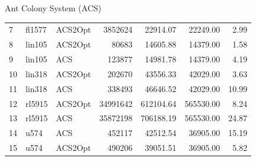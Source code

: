 \documentclass{beamer}
\begin{document}
\begin{frame}{Ant Colony System (ACS)}
\begin{table}[H]
\begin{tabular}{lllrrrr}
            7  & fl1577   & ACS2Opt   & 3852624    & 22914.07       & 22249.00         & 2.99  \\
            8  & lin105   & ACS2Opt   & 80683      & 14605.88       & 14379.00         & 1.58  \\
            9  & lin105   & ACS       & 123877     & 14981.78       & 14379.00         & 4.19  \\
            10 & lin318   & ACS2Opt   & 202670     & 43556.33       & 42029.00         & 3.63  \\
            11 & lin318   & ACS       & 338493     & 46646.52       & 42029.00         & 10.99 \\
            12 & rl5915   & ACS2Opt   & 34991642   & 612104.64      & 565530.00        & 8.24  \\
            13 & rl5915   & ACS       & 35872198   & 706188.19      & 565530.00        & 24.87 \\
            14 & u574     & ACS       & 452117     & 42512.54       & 36905.00         & 15.19 \\
            15 & u574     & ACS2Opt   & 490206     & 39051.51       & 36905.00         & 5.82  \\
            \bottomrule
        \end{tabular}
    \end{table}


\end{frame}
\end{document}
